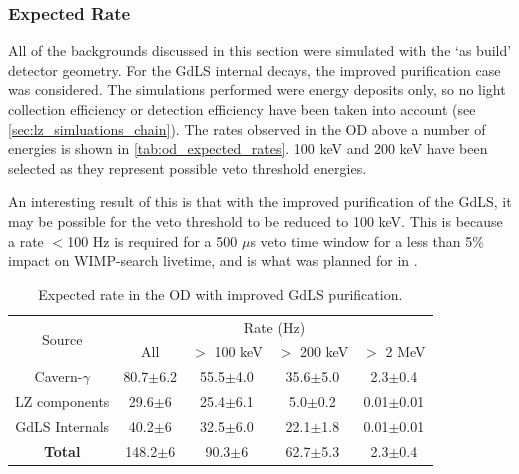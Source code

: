 \subsubsection{Expected Rate}
\par
All of the backgrounds discussed in this section were simulated with the `as build' detector geometry.
For the GdLS internal decays, the improved purification case was considered.
The simulations performed were energy deposits only, so no light collection efficiency or detection efficiency have been taken into account (see \autoref{sec:lz_simluations_chain}).
The rates observed in the OD above a number of energies is shown in \autoref{tab:od_expected_rates}.
100 keV and 200 keV have been selected as they represent possible veto threshold energies.


\par
An interesting result of this is that with the improved purification of the GdLS, it may be possible for the veto threshold to be reduced to 100 keV.
This is because a rate $<$100 Hz is required for a 500 $\mu$s veto time window for a less than 5\% impact on WIMP-search livetime, and is what was planned for in \cite{LZ_TechnicalDesignReview_ref}.

\begin{table}[]
    \centering
    \begin{tabular}{c|c|c|c|c} %
    \hline
    \multirow{2}{*}{Source} & \multicolumn{4}{c}{Rate (Hz)} \\
                            & All          & $>$ 100 keV   & $>$ 200 keV   & $>$ 2 MeV \\ \hline
    Cavern-$\gamma$         & 80.7$\pm$6.2 & 55.5$\pm$4.0  & 35.6$\pm$5.0  & 2.3$\pm$0.4     \\
    LZ components           & 29.6$\pm$6   & 25.4$\pm$6.1  & 5.0$\pm$0.2   & 0.01$\pm$0.01   \\
    GdLS Internals          & 40.2$\pm$6   & 32.5$\pm$6.0  & 22.1$\pm$1.8  & 0.01$\pm$0.01   \\ \hline
    \textbf{Total}          & 148.2$\pm$6  & 90.3$\pm$6    & 62.7$\pm$5.3  & 2.3$\pm$0.4      \\ \hline
    \end{tabular}
    \caption{Expected rate in the OD with improved GdLS purification.}
    \label{tab:od_expected_rates}
\end{table} 




